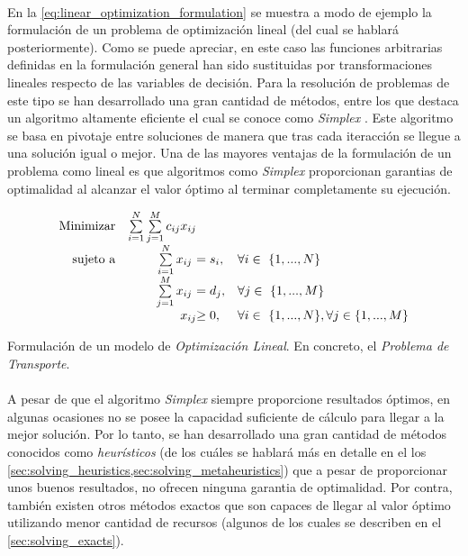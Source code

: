 \documentclass{subfiles}
\begin{document}
        \paragraph{}
        En la \cref{eq:linear_optimization_formulation} se muestra a modo de ejemplo la formulación de un problema de optimización lineal (del cual se hablará posteriormente). Como se puede apreciar, en este caso las funciones arbitrarias definidas en la formulación general han sido sustituidas por transformaciones lineales respecto de las variables de decisión. Para la resolución de problemas de este tipo se han desarrollado una gran cantidad de métodos, entre los que destaca un algoritmo altamente eficiente el cual se conoce como \emph{Simplex} \cite{klee1970good}. Este algoritmo se basa en pivotaje entre soluciones de manera que tras cada iteracción se llegue a una solución igual o mejor. Una de las mayores ventajas de la formulación de un problema como lineal es que algoritmos como \emph{Simplex} proporcionan garantias de optimalidad al alcanzar el valor óptimo al terminar completamente su ejecución.

        \begin{eqfloat}
          \begin{equation}
            \begin{array}{rr@{}ll}
              \text{Minimizar} & \sum\limits_{i = 1}^{N}\sum\limits_{j = 1}^{M}  c_{ij}x_{ij} &                 & \\
              \text{sujeto a}	 & \sum\limits_{i = 1}^{N} x_{ij} \ &= s_{i}, & \forall i \in \{1,...,N\} \\
                               & \sum\limits_{j = 1}^{M} x_{ij} \ &= d_{j}, & \forall j \in \{1,...,M\} \\
                               &                               	x_{ij} 	&\geq 0, 	                 & \forall i \in \{1,...,N\},\forall j \in \{1,...,M\}
            \end{array}
          \end{equation}
          \caption{Formulación de un modelo de \emph{Optimización Lineal}. En concreto, el \emph{Problema de Transporte}.}
          \label{eq:linear_optimization_formulation}
        \end{eqfloat}

        \paragraph{}
        A pesar de que el algoritmo \emph{Simplex} siempre proporcione resultados óptimos, en algunas ocasiones no se posee la capacidad suficiente de cálculo para llegar a la mejor solución. Por lo tanto, se han desarrollado una gran cantidad de métodos conocidos como \emph{heurísticos} (de los cuáles se hablará más en detalle en el los \cref{sec:solving_heuristics,sec:solving_metaheuristics}) que a pesar de proporcionar unos buenos resultados, no ofrecen ninguna garantia de optimalidad. Por contra, también existen otros métodos exactos que son capaces de llegar al valor óptimo utilizando menor cantidad de recursos (algunos de los cuales se describen en el \cref{sec:solving_exacts}).
\end{document}
